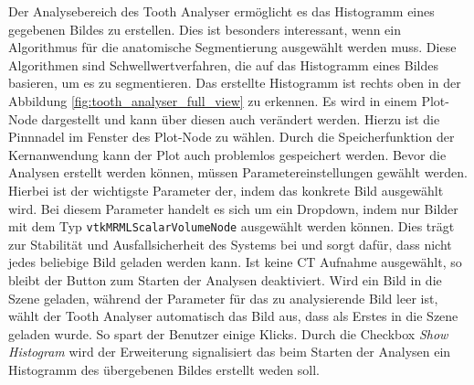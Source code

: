Der Analysebereich des Tooth Analyser ermöglicht es das Histogramm eines gegebenen
Bildes zu erstellen. Dies ist besonders interessant, wenn ein Algorithmus für die
anatomische Segmentierung ausgewählt werden muss. Diese Algorithmen sind
Schwellwertverfahren, die auf das Histogramm eines Bildes basieren, um es zu
segmentieren. Das erstellte Histogramm ist rechts oben in der Abbildung \ref{fig:tooth_analyser_full_view}
zu erkennen. Es wird in einem Plot-Node dargestellt und kann über diesen auch
verändert werden. Hierzu ist die Pinnnadel im Fenster des Plot-Node zu wählen.
Durch die Speicherfunktion der Kernanwendung kann der Plot auch problemlos
gespeichert werden. Bevor die Analysen erstellt werden können, müssen
Parametereinstellungen gewählt werden. Hierbei ist der wichtigste Parameter der,
indem das konkrete Bild ausgewählt wird. Bei diesem Parameter handelt es sich um
ein Dropdown, indem nur Bilder mit dem Typ \texttt{vtkMRMLScalarVolumeNode} ausgewählt
werden können. Dies trägt zur Stabilität und Ausfallsicherheit des Systems bei
und sorgt dafür, dass nicht jedes beliebige Bild geladen werden kann. Ist keine
\ac{CT} Aufnahme ausgewählt, so bleibt der Button zum Starten der Analysen
deaktiviert. Wird ein Bild in die Szene geladen, während der Parameter für das
zu analysierende Bild leer ist, wählt der Tooth Analyser automatisch das Bild aus,
dass als Erstes in die Szene geladen wurde. So spart der Benutzer einige Klicks.
Durch die Checkbox \textit{Show Histogram} wird der Erweiterung signalisiert das
beim Starten der Analysen ein Histogramm des übergebenen Bildes erstellt weden soll.

